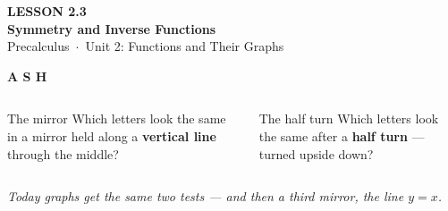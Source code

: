 \documentclass[aspectratio=169, 11pt]{beamer}
\begin{document}
{
\begin{frame}[plain]
  \vspace{2.8cm}\hspace{0.55cm}%
  \begin{minipage}{0.9\textwidth}
    {\color{goldacc}\bfseries\small LESSON 2.3}\\[0.5cm]
    {\color{white}\bfseries\LARGE Symmetry and Inverse Functions}\\[1.2cm]
    {\color{lilacmid}\small Precalculus~$\cdot$~Unit 2: Functions and Their Graphs}
  \end{minipage}
\end{frame}
}

\begin{frame}[t, plain]

  \begin{center}
    {\fontsize{60}{64}\selectfont\sffamily\bfseries\color{plum} A \qquad S \qquad H}
  \end{center}

  \medskip
  \begin{columns}[T]
      \begin{block}{The mirror}
        Which letters look the same in a mirror held along a \textbf{vertical line} through
        the middle?
      \end{block}

      \begin{block}{The half turn}
        Which letters look the same after a \textbf{half turn} --- turned upside down?
      \end{block}
  \end{columns}

  \bigskip
  \textit{Today graphs get the same two tests --- and then a third mirror, the line
  \(y = x\).}
\end{frame}
\end{document}
